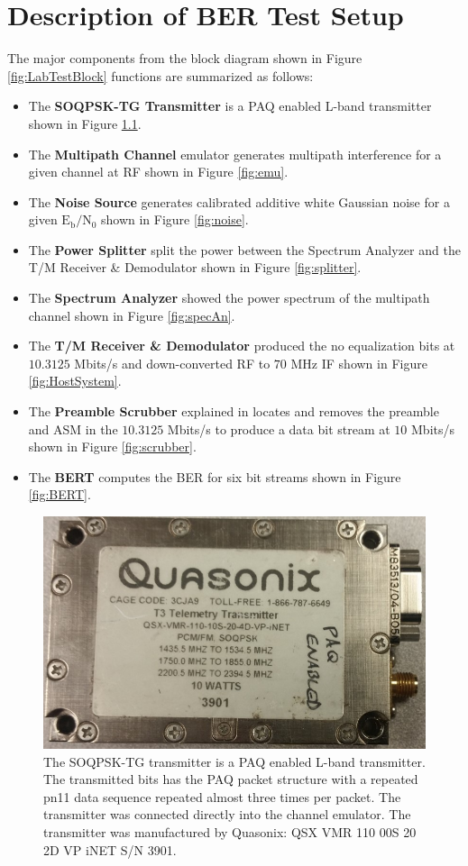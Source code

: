 \chapter{Description of BER Test Setup}
\label{sec:appendxi_setup}
The major components from the block diagram shown in Figure \ref{fig:LabTestBlock} functions are summarized as follows:
\begin{itemize}
\item The \textbf{SOQPSK-TG Transmitter} is a PAQ enabled L-band transmitter shown in Figure \ref{fig:trans}.
\item The \textbf{Multipath Channel} emulator generates multipath interference for a given channel at RF shown in Figure \ref{fig:emu}.
\item The \textbf{Noise Source} generates calibrated additive white Gaussian noise for a given $\text{E}_\text{b}/\text{N}_\text{0}$ shown in Figure \ref{fig:noise}.
\item The \textbf{Power Splitter} split the power between the Spectrum Analyzer and the T/M Receiver \& Demodulator  shown in Figure \ref{fig:splitter}.
\item The \textbf{Spectrum Analyzer} showed the power spectrum of the multipath channel shown in Figure \ref{fig:specAn}.
\item The \textbf{T/M Receiver \& Demodulator} produced the no equalization bits at $10.3125$ Mbits/s and down-converted RF to $70$ MHz IF  shown in Figure \ref{fig:HostSystem}.
\item The \textbf{Preamble Scrubber} explained in \cite{hog2016} locates and removes the preamble and ASM in the $10.3125$ Mbits/s to produce a data bit stream at $10$ Mbits/s shown in Figure \ref{fig:scrubber}.
\item The \textbf{BERT} computes the BER for six bit streams shown in Figure \ref{fig:BERT}.
\end{itemize}
\clearpage
\begin{figure}
	\centering\includegraphics[scale=0.5]{figures/eq_GPUimplementation/trans.jpg}
	\caption{The SOQPSK-TG transmitter is a PAQ enabled L-band transmitter. The transmitted bits has the PAQ packet structure with a repeated pn11 data sequence repeated almost three times per packet. The transmitter was connected directly into the channel emulator. The transmitter was manufactured by Quasonix: QSX VMR 110 00S 20 2D VP iNET S/N 3901.}
	\label{fig:trans}
\end{figure}
